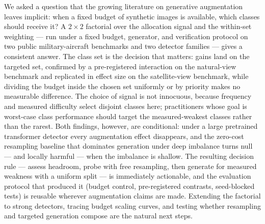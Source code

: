 \documentclass[preprint,12pt,authoryear]{elsarticle}
\begin{document}
We asked a question that the growing literature on generative
augmentation leaves implicit: when a fixed budget of synthetic images is
available, which classes should receive it? A $2\times2$ factorial over
the allocation signal and the within-set weighting --- run under a fixed
budget, generator, and verification protocol on two public
military-aircraft benchmarks and two detector families --- gives a
consistent answer. The class set is the decision that matters: gains
land on the targeted set, confirmed by a pre-registered interaction on
the natural-view benchmark and replicated in effect size on the
satellite-view benchmark, while dividing the budget inside the chosen
set uniformly or by priority makes no measurable difference. The choice
of signal is not innocuous, because frequency and measured difficulty
select disjoint classes here; practitioners whose goal is worst-case
class performance should target the measured-weakest classes rather
than the rarest. Both findings, however, are conditional: under a large
pretrained transformer detector every augmentation effect disappears,
and the zero-cost resampling baseline that dominates generation under
deep imbalance turns null --- and locally harmful --- when the imbalance
is shallow. The resulting decision rule --- assess headroom, probe with
free resampling, then generate for measured weakness with a uniform
split --- is immediately actionable, and the evaluation protocol that
produced it (budget control, pre-registered contrasts, seed-blocked
tests) is reusable wherever augmentation claims are made. Extending the
factorial to strong detectors, tracing budget scaling curves, and
testing whether resampling and targeted generation compose are the
natural next steps.



\end{document}
